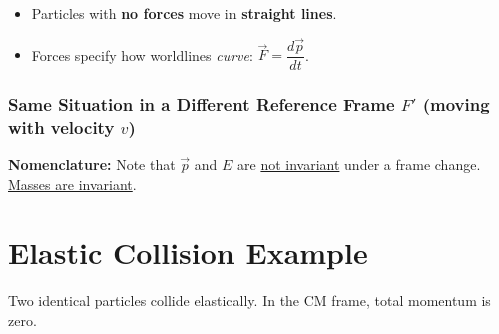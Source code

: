 \begin{itemize}
  \item Particles with \textbf{no forces} move in \textbf{straight lines}.
  \item Forces specify how worldlines \emph{curve}: $\vec{F} = \dfrac{d\vec{p}}{dt}$.
\end{itemize}

\subsubsection*{Same Situation in a Different Reference Frame $F'$ (moving with velocity $v$)}

\begin{center}
\end{center}

\textbf{Nomenclature:} Note that $\vec{p}$ and $E$ are \underline{not invariant} under a frame change.
\underline{Masses are invariant}.

\section*{Elastic Collision Example}

Two identical particles collide elastically.  In the CM frame, total momentum is zero.


